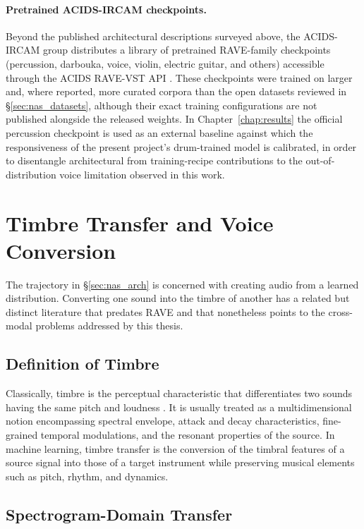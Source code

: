 \documentclass[a4paper,11pt,oneside,openany]{book}
\begin{document}
\paragraph{Pretrained ACIDS-IRCAM checkpoints.} Beyond the published architectural descriptions surveyed above, the ACIDS-IRCAM group distributes a library of pretrained RAVE-family checkpoints (percussion, darbouka, voice, violin, electric guitar, and others) accessible through the ACIDS RAVE-VST API \parencite{acidsircam2024models}. These checkpoints were trained on larger and, where reported, more curated corpora than the open datasets reviewed in \S\ref{sec:nas_datasets}, although their exact training configurations are not published alongside the released weights. In Chapter~\ref{chap:results} the official percussion checkpoint is used as an external baseline against which the responsiveness of the present project's drum-trained model is calibrated, in order to disentangle architectural from training-recipe contributions to the out-of-distribution voice limitation observed in this work.

\section{Timbre Transfer and Voice Conversion}\label{sec:timbre_transfer}

The trajectory in \S\ref{sec:nas_arch} is concerned with creating audio from a learned distribution. Converting one sound into the timbre of another has a related but distinct literature that predates RAVE and that nonetheless points to the cross-modal problems addressed by this thesis.

\subsection*{Definition of Timbre}

Classically, timbre is the perceptual characteristic that differentiates two sounds having the same pitch and loudness \parencite{ansi1994timbre}. It is usually treated as a multidimensional notion encompassing spectral envelope, attack and decay characteristics, fine-grained temporal modulations, and the resonant properties of the source. In machine learning, timbre transfer is the conversion of the timbral features of a source signal into those of a target instrument while preserving musical elements such as pitch, rhythm, and dynamics.

\subsection*{Spectrogram-Domain Transfer}
\end{document}
